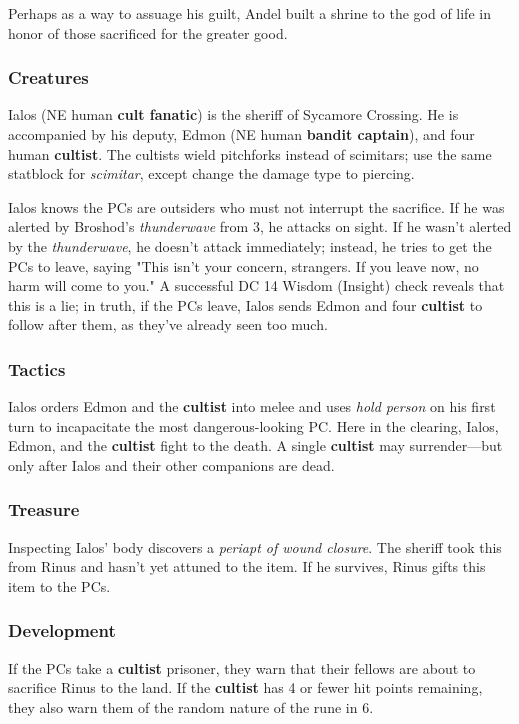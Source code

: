 \documentclass[10pt,a4paper,twoside,bg=print,twocolumn,openany,nodeprecatedcode]{dndbook}
\begin{document}
Perhaps as a way to assuage his guilt, Andel built a shrine to the god of life in honor of those sacrificed for the greater good.

\subsubsection{Creatures}
Ialos (NE human \textbf{cult fanatic}) is the sheriff of Sycamore Crossing. He is accompanied by his deputy, Edmon (NE human \textbf{bandit captain}), and four human \textbf{cultist}. The cultists wield pitchforks instead of scimitars; use the same statblock for \textit{scimitar}, except change the damage type to piercing.

Ialos knows the PCs are outsiders who must not interrupt the sacrifice. If he was alerted by Broshod's \textit{thunderwave} from 3, he attacks on sight. If he wasn't alerted by the \textit{thunderwave}, he doesn't attack immediately; instead, he tries to get the PCs to leave, saying "This isn't your concern, strangers. If you leave now, no harm will come to you." A successful DC 14 Wisdom (Insight) check reveals that this is a lie; in truth, if the PCs leave, Ialos sends Edmon and four \textbf{cultist} to follow after them, as they've already seen too much.

\subsubsection{Tactics}
Ialos orders Edmon and the \textbf{cultist} into melee and uses \textit{hold person} on his first turn to incapacitate the most dangerous-looking PC. Here in the clearing, Ialos, Edmon, and the \textbf{cultist} fight to the death. A single \textbf{cultist} may surrender—but only after Ialos and their other companions are dead.

\subsubsection{Treasure}
Inspecting Ialos' body discovers a \textit{periapt of wound closure}. The sheriff took this from Rinus and hasn't yet attuned to the item. If he survives, Rinus gifts this item to the PCs.

\subsubsection{Development}
If the PCs take a \textbf{cultist} prisoner, they warn that their fellows are about to sacrifice Rinus to the land. If the \textbf{cultist} has 4 or fewer hit points remaining, they also warn them of the random nature of the rune in 6.
\end{document}
